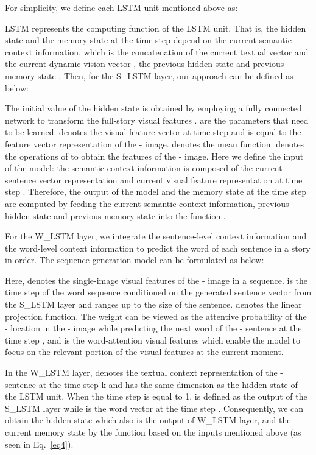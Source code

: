 \documentclass[a4paper,fleqn]{cas-sc}
\begin{document}
For simplicity, we define each LSTM unit mentioned above as:
 
 
LSTM represents the computing function of the LSTM unit. That is, the hidden state  and the memory state  at the time step   depend on the current semantic context information, which is the concatenation of the current textual vector  and the current dynamic vision vector , the previous hidden state  and previous memory state . Then, for the S\_LSTM layer, our approach can be defined as below:



The initial value of the hidden state  is obtained by employing a fully connected network to transform the full-story visual features .  are the parameters that need to be learned.  denotes the visual feature vector at time step  and is equal to the feature vector representation of the - image. 
 denotes the mean function.  denotes the operations of  to obtain the features of the - image.
Here we define the input of the model: the semantic context information is composed of the current sentence vector representation  and current visual feature representation  at time step . Therefore, the output of the model  and the memory state  at the time step  are computed by feeding the current semantic context information, previous hidden state  and previous memory state  into the function .

For the W\_LSTM layer, we integrate the sentence-level context information and the word-level context information to predict the word of each sentence in a story in order. The sequence generation model can be formulated as below:



Here,  denotes the single-image visual features of the - image in a sequence.  is the time step of the word sequence conditioned on the generated sentence vector from the S\_LSTM layer and ranges up to  the size of the sentence. 
  denotes the linear projection function.
The weight  can be viewed as the attentive probability of the - location in the - image while predicting the next word of the - sentence at the time step , and  is the word-attention visual features which enable the model to focus on the relevant portion of the visual features at the current moment.

In the W\_LSTM layer,    denotes the textual context representation of the - sentence at the time step k and has the same dimension as the hidden state of the LSTM unit. When the time step  is equal to 1,  is defined as the output  of the S\_LSTM layer while  is the word vector  at the time step . Consequently, we can obtain the hidden state  which also is the output of W\_LSTM layer, and the current memory state  by the function  based on the inputs mentioned above (as seen in Eq.~\ref{eq4}).
\end{document}
